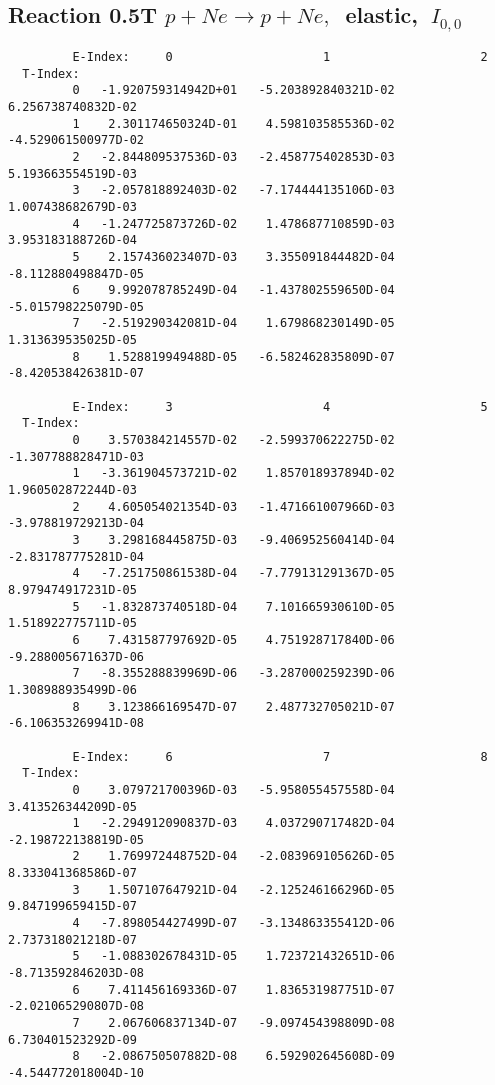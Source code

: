 \documentclass[12pt,dvipdfmx]{article}
\begin{document}
\subsection{
Reaction 0.5T  $p + Ne \rightarrow p + Ne ,\ $
 elastic, $\  I_{0,0}$
}

\begin{small}\begin{verbatim}
         E-Index:     0                     1                     2
  T-Index:
         0   -1.920759314942D+01   -5.203892840321D-02    6.256738740832D-02
         1    2.301174650324D-01    4.598103585536D-02   -4.529061500977D-02
         2   -2.844809537536D-03   -2.458775402853D-03    5.193663554519D-03
         3   -2.057818892403D-02   -7.174444135106D-03    1.007438682679D-03
         4   -1.247725873726D-02    1.478687710859D-03    3.953183188726D-04
         5    2.157436023407D-03    3.355091844482D-04   -8.112880498847D-05
         6    9.992078785249D-04   -1.437802559650D-04   -5.015798225079D-05
         7   -2.519290342081D-04    1.679868230149D-05    1.313639535025D-05
         8    1.528819949488D-05   -6.582462835809D-07   -8.420538426381D-07

         E-Index:     3                     4                     5
  T-Index:
         0    3.570384214557D-02   -2.599370622275D-02   -1.307788828471D-03
         1   -3.361904573721D-02    1.857018937894D-02    1.960502872244D-03
         2    4.605054021354D-03   -1.471661007966D-03   -3.978819729213D-04
         3    3.298168445875D-03   -9.406952560414D-04   -2.831787775281D-04
         4   -7.251750861538D-04   -7.779131291367D-05    8.979474917231D-05
         5   -1.832873740518D-04    7.101665930610D-05    1.518922775711D-05
         6    7.431587797692D-05    4.751928717840D-06   -9.288005671637D-06
         7   -8.355288839969D-06   -3.287000259239D-06    1.308988935499D-06
         8    3.123866169547D-07    2.487732705021D-07   -6.106353269941D-08

         E-Index:     6                     7                     8
  T-Index:
         0    3.079721700396D-03   -5.958055457558D-04    3.413526344209D-05
         1   -2.294912090837D-03    4.037290717482D-04   -2.198722138819D-05
         2    1.769972448752D-04   -2.083969105626D-05    8.333041368586D-07
         3    1.507107647921D-04   -2.125246166296D-05    9.847199659415D-07
         4   -7.898054427499D-07   -3.134863355412D-06    2.737318021218D-07
         5   -1.088302678431D-05    1.723721432651D-06   -8.713592846203D-08
         6    7.411456169336D-07    1.836531987751D-07   -2.021065290807D-08
         7    2.067606837134D-07   -9.097454398809D-08    6.730401523292D-09
         8   -2.086750507882D-08    6.592902645608D-09   -4.544772018004D-10
\end{verbatim}\end{small}
\end{document}
